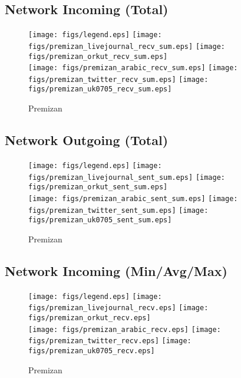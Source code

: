 \documentclass{article}
\newcommand{\bline}[1][1]{\vspace{#1\baselineskip}}
\begin{document}
\pagebreak
\subsection{Network Incoming (Total)}
\begin{figure}[!h]
  \bline[1]
  \centering
  \texttt{[image: figs/legend.eps]}\hspace{3em}%
  \texttt{[image: figs/premizan\_livejournal\_recv\_sum.eps]}\hspace{1em}%
  \texttt{[image: figs/premizan\_orkut\_recv\_sum.eps]}\\
  \texttt{[image: figs/premizan\_arabic\_recv\_sum.eps]}\hspace{1em}%
  \texttt{[image: figs/premizan\_twitter\_recv\_sum.eps]}\hspace{1em}%
  \texttt{[image: figs/premizan\_uk0705\_recv\_sum.eps]}
  \caption{Premizan}
\end{figure}

\pagebreak
\subsection{Network Outgoing (Total)}
\begin{figure}[!h]
  \bline[1]
  \centering
  \texttt{[image: figs/legend.eps]}\hspace{3em}%
  \texttt{[image: figs/premizan\_livejournal\_sent\_sum.eps]}\hspace{1em}%
  \texttt{[image: figs/premizan\_orkut\_sent\_sum.eps]}\\
  \texttt{[image: figs/premizan\_arabic\_sent\_sum.eps]}\hspace{1em}%
  \texttt{[image: figs/premizan\_twitter\_sent\_sum.eps]}\hspace{1em}%
  \texttt{[image: figs/premizan\_uk0705\_sent\_sum.eps]}
  \caption{Premizan}
\end{figure}

\pagebreak
\subsection{Network Incoming (Min/Avg/Max)}
\begin{figure}[!h]
  \bline[1]
  \centering
  \texttt{[image: figs/legend.eps]}\hspace{3em}%
  \texttt{[image: figs/premizan\_livejournal\_recv.eps]}\hspace{1em}%
  \texttt{[image: figs/premizan\_orkut\_recv.eps]}\\
  \texttt{[image: figs/premizan\_arabic\_recv.eps]}\hspace{1em}%
  \texttt{[image: figs/premizan\_twitter\_recv.eps]}\hspace{1em}%
  \texttt{[image: figs/premizan\_uk0705\_recv.eps]}
  \caption{Premizan}
\end{figure}
\end{document}
